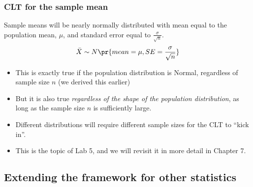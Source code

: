 \documentclass[t,compress,mathserif]{beamer}
\begin{document}

\begin{frame}
\frametitle{CLT for the sample mean}

{Sample means will be nearly normally distributed with mean equal to the population mean, $\mu$, and standard error equal to $\frac{\sigma}{\sqrt{n}}$.
\[ \bar{X} \sim N \pr{ mean = \mu, SE = \frac{\sigma}{\sqrt{n}} } \]
}

\begin{itemize}
    \item This is exactly true if the population distribution is Normal, regardless of sample size $n$ (we derived this earlier)
    \item But it is also true \emph{regardless of the shape of the population distribution}, as long as the sample size $n$ is sufficiently large.
    \item Different distributions will require different sample sizes for the CLT to ``kick in''.
    \item This is the topic of Lab 5, and we will revisit it in more detail in Chapter 7.
\end{itemize}

\end{frame}


\subsection{Extending the framework for other statistics}

\end{document}
